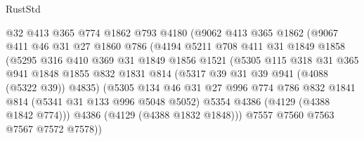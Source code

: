 \begin{lexlean}{RustStd}
\begin{coremodule}
                        @32
                        @413
                        @365
                        @774
                        @1862
                        @793
                        @4180
                        (@9062
                          @413
                          @365
                          @1862
                          (@9067
                            @411
                            @46
                            @31
                            @27
                            @1860
                            @786
                            (@4194
                              @5211
                              @708
                              @411
                              @31
                              @1849
                              @1858
                              (@5295
                                @316
                                @410
                                @369
                                @31
                                @1849
                                @1856
                                @1521
                                (@5305
                                  @115
                                  @318
                                  @31
                                  @365
                                  @941
                                  @1848
                                  @1855
                                  @832
                                  @1831
                                  @814
                                  (@5317 @39 @31 @39 @941 (@4088 (@5322 @39)) @4835)
                                  (@5305
                                    @134
                                    @46
                                    @31
                                    @27
                                    @996
                                    @774
                                    @786
                                    @832
                                    @1841
                                    @814
                                    (@5341 @31 @133 @996 @5048 @5052)
                                    @5354
                                    @4386
                                    (@4129 (@4388 @1842 @774)))
                                  @4386
                                  (@4129 (@4388 @1832 @1848)))
                                @7557
                                @7560
                                @7563
                                @7567
                                @7572
                                @7578))

\end{coremodule}
\end{lexlean}
